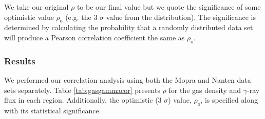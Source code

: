 \documentclass[12pt,a4paper]{article}
\begin{document}
We take our original $\rho$ to be our final value but we quote the significance of some optimistic value $\rho_\mathrm{o}$ (e.g. the 3 $\sigma$ value from the distribution). 
The significance is determined by calculating the probability that a randomly distributed data set will produce a Pearson correlation coefficient the same as $\rho_\mathrm{o}$.


\subsubsection{Results}
We performed our correlation analysis using both the Mopra and Nanten data sets separately. 
Table \ref{tab:gasgammacor} presents $\rho$ for the gas density and $\gamma$-ray flux in each region. 
Additionally, the optimistic (3 $\sigma$) value, $\rho_\mathrm{o}$, is specified along with its statistical significance.
\end{document}
